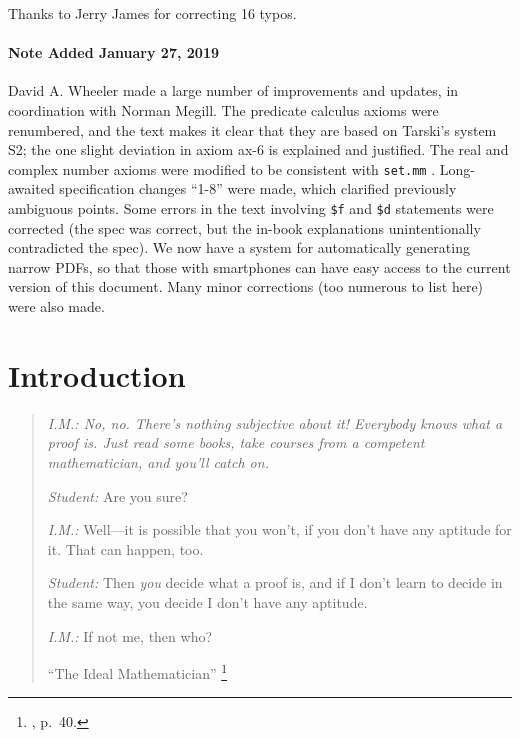 Thanks to Jerry James for correcting 16 typos.

\subsubsection{Note Added January 27, 2019}\label{note2019}

David A. Wheeler
made a large number of improvements and updates,
in coordination with Norman Megill.
The predicate calculus axioms were renumbered, and the text makes
it clear that they are based on Tarski's system S2;
the one slight deviation in axiom ax-6 is explained and justified.
The real and complex number axioms were modified to be consistent with
\texttt{set.mm}%
.
Long-awaited specification changes ``1-8'' were made,
which clarified previously ambiguous points.
Some errors in the text involving \texttt{\$f} and
\texttt{\$d} statements were corrected (the spec was correct, but
the in-book explanations unintentionally contradicted the spec).
We now have a system for automatically generating narrow PDFs,
so that those with smartphones can have easy access to the current
version of this document.
Many minor corrections (too numerous to list here) were also made.

\chapter{Introduction}

\begin{quotation}
  {\em {\em I.M.:}  No, no.  There's nothing subjective about it!  Everybody
knows what a proof is.  Just read some books, take courses from a competent
mathematician, and you'll catch on.

{\em Student:}  Are you sure?

{\em I.M.:}  Well---it is possible that you won't, if you don't have any
aptitude for it.  That can happen, too.

{\em Student:}  Then {\em you} decide what a proof is, and if I don't learn
to decide in the same way, you decide I don't have any aptitude.

{\em I.M.:}  If not me, then who?}
    \flushright\sc  ``The Ideal Mathematician''
    \footnote{\cite{Davis}, p.~40.}\\
\end{quotation}

